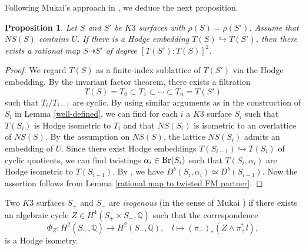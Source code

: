 \documentclass{article}
\theoremstyle{plain}
\newtheorem{proposition}[theorem]{Proposition}%
\theoremstyle{definition}
\theoremstyle{remark}
\newcommand{\Q}{{\mathbb Q}}
\begin{document}
Following Mukai's approach in \cite{Mu},   
we deduce the next proposition.   





\begin{proposition}\label{Hodge embedding and rational map}
Let $S$ and $S'$ be $K3$ surfaces with 
$\rho (S) = \rho (S')$. 
Assume that $NS(S)$ contains $U$. 
If there is a Hodge embedding $T(S) \hookrightarrow T(S')$, 
then there exists a rational map $S \dashrightarrow S'$ 
of degree $[ T(S') : T(S) ]^{2}$. 
\end{proposition} 



\begin{proof}
We regard $T(S)$ as a finite-index sublattice of $T(S')$ 
via the Hodge embedding. 
By the invariant factor theorem, 
there exists a filtration 
\begin{equation*} 
T(S) = T_{0} \subset T_{1} \subset \cdots \subset T_{n} = T(S')  
\end{equation*}
such that 
$T_{i}/T_{i-1}$ are cyclic. 
By using similar arguments as in 
the construction of $S_{l}$ in Lemma \ref{well-defined}, 
we can find for each $i$ a $K3$ surface $S_{i}$ 
such that $T(S_{i})$ is Hodge isometric to $T_{i}$  
and that $NS(S_{i})$ is isometric to an overlattice of $NS(S)$.    
By the assumption on $NS(S)$,    
the lattice $NS(S_{i})$ admits an embedding of $U$. 
Since there exist 
Hodge embeddings $T(S_{i-1}) \hookrightarrow T(S_{i})$ 
of cyclic quotients, 
we can find twistings 
$\alpha _{i} \in {\rm Br\/}(S_{i})$ 
such that 
$T(S_{i}, \alpha _{i})$ 
are Hodge isometric to 
$T(S_{i-1})$.
By \cite{H-S2}, 
we have 
$D^{b}(S_{i}, \alpha _{i}) \simeq D^{b}(S_{i-1})$. 
Now the assertion follows from 
Lemma \ref{rational map to twisted FM partner}. 
\end{proof}









Two $K3$ surfaces $S_{+}$ and $S_{-}$ are 
{\it isogenous\/} 
(in the sense of Mukai \cite{Mu}) 
if there exists an algebraic cycle 
$Z \in H^{4}(S_{+} \times S_{-}, {\Q})$ 
such that the correspondence 
\begin{equation*}\label{correspondence} 
\Phi _{Z} : H^{2}(S_{+}, {\Q}) \to H^{2}(S_{-}, {\Q}), \: \: \: \:  
l \mapsto (\pi _{-})_{\ast} (Z \wedge \pi _{+}^{\ast}l), 
\end{equation*}
is a Hodge isometry. 
\end{document}
